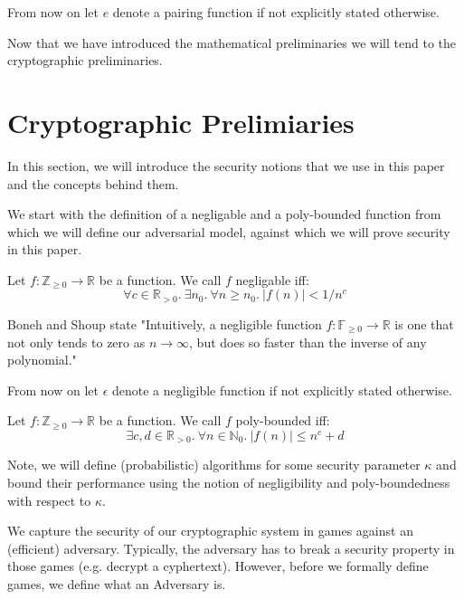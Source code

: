 From now on let $e$ denote a pairing function if not explicitly stated otherwise.

Now that we have introduced the mathematical preliminaries we will tend to the cryptographic preliminaries. 

\section{Cryptographic Prelimiaries}
In this section, we will introduce the security notions that we use in this paper and the concepts behind them.

We start with the definition of a negligable and a poly-bounded function from which we will define our adversarial model, against which we will prove security in this paper.

\begin{definition}
    Let $f: \mathbb{Z}_{\ge 0} \rightarrow \mathbb{R}$ be a function. We call $f$ negligable iff:
    \begin{equation*}
        \forall c \in \mathbb{R}_{> 0}. \ \exists n_0. \ \forall n \ge n_0. \ \vert f(n)\vert < 1/n^c
    \end{equation*}
    \parencite{boneh_shoup}
\end{definition}
Boneh and Shoup state "Intuitively, a negligible function $f:\mathbb{F}_{\ge 0} \rightarrow \mathbb{R}$ is one that not only tends to zero as $n \rightarrow \infty$, but
does so faster than the inverse of any polynomial." \parencite{boneh_shoup}

From now on let $\epsilon$ denote a negligible function if not explicitly stated otherwise. 

\begin{definition}
    Let $f: \mathbb{Z}_{\ge 0} \rightarrow \mathbb{R}$ be a function. We call $f$ poly-bounded iff:
    \begin{equation*}
        \exists c,d \in \mathbb{R}_{>0}. \ \forall n \in \mathbb{N}_0. \ \vert f(n)\vert \le n^c+d
    \end{equation*}
    \parencite{boneh_shoup}
\end{definition}


Note, we will define (probabilistic) algorithms for some security parameter $\kappa$ and bound their performance using the notion of negligibility and poly-boundedness with respect to $\kappa$.

We capture the security of our cryptographic system in games against an (efficient) adversary. Typically, the adversary has to break a security property in those games (e.g. decrypt a cyphertext). However, before we formally define games, we define what an Adversary is.

